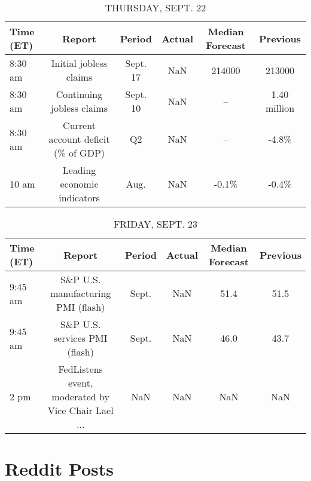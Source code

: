 \documentclass{book}
\begin{document}
  
  
  \begin{table}[htbp]%
  \caption{THURSDAY, SEPT. 22}%
  \centering%
  \begin{adjustbox}{width=1\textwidth}%
  \begin{tabular}{lccccc}
  \toprule
  Time (ET) &                             Report &   Period & Actual & Median Forecast &     Previous \\
  \midrule
    8:30 am &             Initial jobless claims & Sept. 17 &    NaN &          214000 &       213000 \\
    8:30 am &          Continuing jobless claims & Sept. 10 &    NaN &              -- & 1.40 million \\
    8:30 am & Current account deficit (\% of GDP) &       Q2 &    NaN &              -- &        -4.8\% \\
      10 am &        Leading economic indicators &     Aug. &    NaN &           -0.1\% &        -0.4\% \\
  \bottomrule
  \end{tabular}
  \end{adjustbox}%
  \end{table}
  
  
  
  \begin{table}[htbp]%
  \caption{FRIDAY, SEPT. 23}%
  \centering%
  \begin{adjustbox}{width=1\textwidth}%
  \begin{tabular}{lccccc}
  \toprule
  Time (ET) &                                             Report & Period & Actual & Median Forecast & Previous \\
  \midrule
    9:45 am &                 S\&P U.S. manufacturing PMI (flash) &  Sept. &    NaN &            51.4 &     51.5 \\
    9:45 am &                      S\&P U.S. services PMI (flash) &  Sept. &    NaN &            46.0 &     43.7 \\
       2 pm & FedListens event, moderated by Vice Chair Lael ... &    NaN &    NaN &             NaN &      NaN \\
  \bottomrule
  \end{tabular}
  \end{adjustbox}%
  \end{table}
  
  \section{Reddit Posts}%
  \label{sec:RedditPosts}%
  
\end{document}
